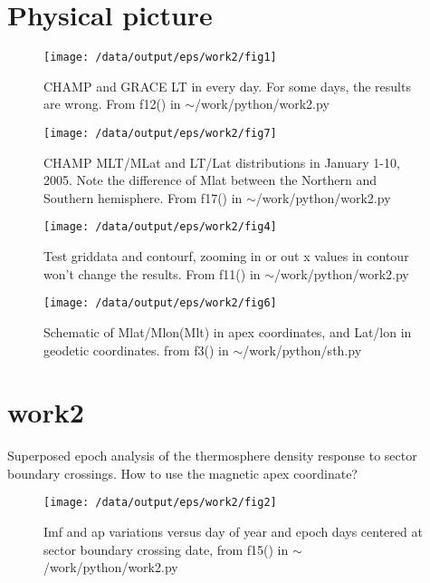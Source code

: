 \documentclass[12pt,a4paper]{article}
\begin{document}
\section{Physical picture}
\begin{figure}[!ht]
    \begin{center}
        \texttt{[image: /data/output/eps/work2/fig1]}
        \caption{CHAMP and GRACE LT in every day. For some days, the results are wrong. From f12() in $\sim$/work/python/work2.py}
    \end{center}
    \label{fig1}
\end{figure}

\begin{figure}[!ht]
    \begin{center}
        \texttt{[image: /data/output/eps/work2/fig7]}
        \caption{ CHAMP MLT/MLat and LT/Lat distributions in January 1-10, 2005. Note the difference of Mlat between the Northern and Southern hemisphere. From f17() in $\sim$/work/python/work2.py}
    \end{center}
    \label{fig7}
\end{figure}

\begin{figure}[!ht]
    \begin{center}
        \texttt{[image: /data/output/eps/work2/fig4]}
        \caption{Test griddata and contourf, zooming in or out x values in contour won't change the results. From f11() in $\sim$/work/python/work2.py}
    \end{center}
    \label{fig4}
\end{figure}

\begin{figure}[!ht]
    \begin{center}
        \texttt{[image: /data/output/eps/work2/fig6]}
        \caption{Schematic of Mlat/Mlon(Mlt) in apex coordinates, and Lat/lon in geodetic coordinates. from f3() in $\sim$/work/python/sth.py}
    \end{center}
    \label{fig6}
\end{figure}
\newpage

\section{work2}
Superposed epoch analysis of the thermosphere density response to sector boundary crossings.
How to use the magnetic apex coordinate?
\begin{figure}[!ht]
    \begin{center}
        \texttt{[image: /data/output/eps/work2/fig2]}
        \caption{Imf and ap variations versus day of year and epoch days centered at sector boundary crossing date, from f15() in $\sim$/work/python/work2.py}
    \end{center}
    \label{fig2}
\end{figure}
\end{document}
